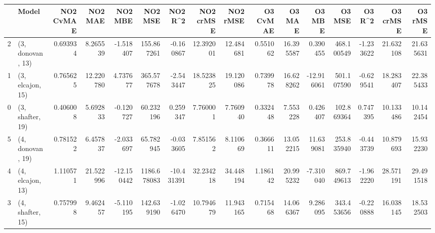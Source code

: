 \begin{tabular}{llrrrrrrrrrrrrrr}
\toprule
{} &             Model &  NO2 CvMAE &    NO2 MAE &    NO2 MBE &      NO2 MSE &    NO2 R\textasciicircum2 &  NO2 crMSE &   NO2 rMSE &  O3 CvMAE &     O3 MAE &     O3 MBE &      O3 MSE &    O3 R\textasciicircum2 &   O3 crMSE &    O3 rMSE \\
\midrule
2 &  (3, donovan, 13) &   0.693934 &   8.265539 &  -1.518407 &   155.867261 &  -0.160867 &  12.392001 &  12.484681 &  0.551062 &  16.395587 &   0.390455 &  468.100549 & -1.233622 &  21.632108 &  21.635631 \\
1 &  (3, elcajon, 15) &   0.765625 &  12.220780 &   4.737677 &   365.577678 &  -2.543447 &  18.523825 &  19.120086 &  0.739978 &  16.628262 & -12.916061 &  501.107590 & -0.629541 &  18.283407 &  22.385433 \\
0 &  (3, shafter, 19) &   0.406008 &   5.692833 &  -0.120727 &    60.232196 &   0.259347 &   7.760001 &   7.760940 &  0.332448 &   7.553228 &   0.426407 &  102.869364 &  0.747395 &  10.133486 &  10.142454 \\
5 &  (4, donovan, 19) &   0.781522 &   6.457837 &  -2.033697 &    65.782945 &  -0.033605 &   7.851562 &   8.110669 &  0.366611 &  13.052215 &  11.639081 &  253.835940 & -0.443739 &  10.879693 &  15.932230 \\
4 &  (4, elcajon, 13) &   1.110571 &  21.522996 & -12.150442 &  1186.678083 & -10.431391 &  32.234218 &  34.448194 &  1.186142 &  20.995232 &  -7.310040 &  869.749613 & -1.962220 &  28.571191 &  29.491518 \\
3 &  (4, shafter, 15) &   0.757998 &   9.462457 &  -5.110195 &   142.639190 &  -1.026470 &  10.794679 &  11.943165 &  0.715468 &  14.066367 &   9.286095 &  343.453656 & -0.220888 &  16.038145 &  18.532503 \\
\bottomrule
\end{tabular}
